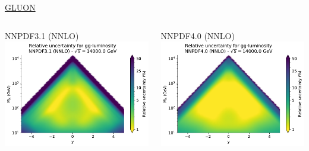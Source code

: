 \documentclass{beamer}
\begin{document}
\begin{frame}
\begin{overlayarea}{\textwidth}{5.2cm}
{\begin{columns}[c]
\begin{column}{0.5\textwidth}
   \end{column}
  \end{columns}  
  }   
  {
  \centering
  \underline{GLUON}\\
  \begin{columns}[c]
   \begin{column}{0.5\textwidth}
    \centering
        NNPDF3.1 (NNLO)\\
        \vspace{0.1cm}
        \includegraphics[width=\columnwidth]{plots/plot_lumi2d_uncertainty_NNPDF31_gg}\\
   \end{column}
   \begin{column}{0.5\textwidth}
    \centering
        NNPDF4.0 (NNLO)\\
        \vspace{0.1cm}
        \includegraphics[width=\columnwidth]{plots/plot_lumi2d_uncertainty_NNPDF40_gg}\\    

\end{column}
\end{columns}}
\end{overlayarea}
\end{frame}
\end{document}
